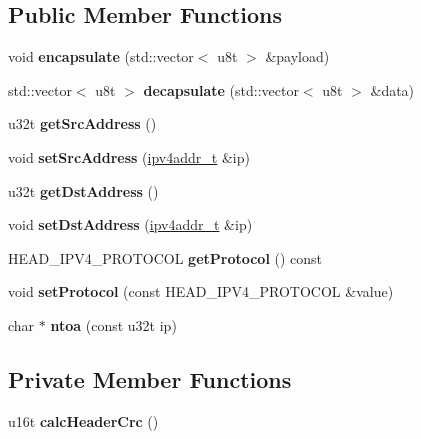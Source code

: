 \subsection*{Public Member Functions}
\begin{DoxyCompactItemize}
\item 
\mbox{\label{classIPv4_a1a9cf95c0b539638ccf87ec9540d1f5f}} 
void {\bfseries encapsulate} (std\+::vector$<$ u8t $>$ \&payload)
\item 
\mbox{\label{classIPv4_ac755be8eb652472e2976200f4c7112da}} 
std\+::vector$<$ u8t $>$ {\bfseries decapsulate} (std\+::vector$<$ u8t $>$ \&data)
\item 
\mbox{\label{classIPv4_aee57f9b38cf587fd7580324b4e0cf363}} 
u32t {\bfseries get\+Src\+Address} ()
\item 
\mbox{\label{classIPv4_a4b2067f9ec3bc10827b005a41ab8629c}} 
void {\bfseries set\+Src\+Address} (\mbox{\hyperlink{unionipv4addr__t}{ipv4addr\+\_\+t}} \&ip)
\item 
\mbox{\label{classIPv4_a3d00ed1f1cbee5b83110c896b785cf2a}} 
u32t {\bfseries get\+Dst\+Address} ()
\item 
\mbox{\label{classIPv4_afdf051ffbaafe88e789a222f39a75226}} 
void {\bfseries set\+Dst\+Address} (\mbox{\hyperlink{unionipv4addr__t}{ipv4addr\+\_\+t}} \&ip)
\item 
\mbox{\label{classIPv4_abd91126dd9d1f07b31e42b7df0d5f210}} 
H\+E\+A\+D\+\_\+\+I\+P\+V4\+\_\+\+P\+R\+O\+T\+O\+C\+OL {\bfseries get\+Protocol} () const
\item 
\mbox{\label{classIPv4_ac157b4db97d939fbe2c3f3ae0ed1425a}} 
void {\bfseries set\+Protocol} (const H\+E\+A\+D\+\_\+\+I\+P\+V4\+\_\+\+P\+R\+O\+T\+O\+C\+OL \&value)
\item 
\mbox{\label{classIPv4_a46bc1d4063db256e32195873bc52ba6a}} 
char $\ast$ {\bfseries ntoa} (const u32t ip)
\end{DoxyCompactItemize}
\subsection*{Private Member Functions}
\begin{DoxyCompactItemize}
\item 
\mbox{\label{classIPv4_a302dbff73ecbbdf99d3552fb996362b9}} 
u16t {\bfseries calc\+Header\+Crc} ()
\end{DoxyCompactItemize}
